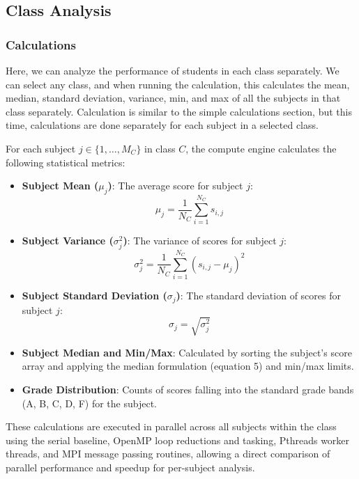 \documentclass[12pt,a4paper]{article}
\begin{document}
\clearpage

\subsection{Class Analysis}

\subsubsection{Calculations}
Here, we can analyze the performance of students in each class separately. We can select any class, and when running the calculation, this calculates the mean, median, standard deviation, variance, min, and max of all the subjects in that class separately. Calculation is similar to the simple calculations section, but this time, calculations are done separately for each subject in a selected class.

For each subject $j \in \{1, \dots, M_C\}$ in class $C$, the compute engine calculates the following statistical metrics:
\begin{itemize}
    \item \textbf{Subject Mean ($\mu_j$)}: The average score for subject $j$:
    \begin{equation}
        \mu_j = \frac{1}{N_C} \sum_{i=1}^{N_C} s_{i,j}
    \end{equation}
    \item \textbf{Subject Variance ($\sigma_j^2$)}: The variance of scores for subject $j$:
    \begin{equation}
        \sigma_j^2 = \frac{1}{N_C} \sum_{i=1}^{N_C} (s_{i,j} - \mu_j)^2
    \end{equation}
    \item \textbf{Subject Standard Deviation ($\sigma_j$)}: The standard deviation of scores for subject $j$:
    \begin{equation}
        \sigma_j = \sqrt{\sigma_j^2}
    \end{equation}
    \item \textbf{Subject Median and Min/Max}: Calculated by sorting the subject's score array and applying the median formulation (equation 5) and min/max limits.
    \item \textbf{Grade Distribution}: Counts of scores falling into the standard grade bands (A, B, C, D, F) for the subject.
\end{itemize}
These calculations are executed in parallel across all subjects within the class using the serial baseline, OpenMP loop reductions and tasking, Pthreads worker threads, and MPI message passing routines, allowing a direct comparison of parallel performance and speedup for per-subject analysis.
\end{document}
